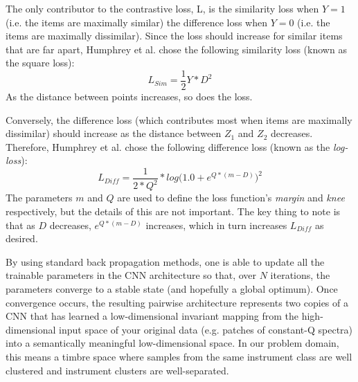 \documentclass[12pt]{report} 	%
\numberwithin{figure}{chapter}
\numberwithin{table}{chapter}
\numberwithin{equation}{chapter}
\begin{document}
\begin{flushleft}
The only contributor to the contrastive loss, L, is the similarity loss when $Y=1$ (i.e. the items are maximally similar) the difference loss when $Y=0$ (i.e. the items are maximally dissimilar). Since the loss should increase for similar items that are far apart, Humphrey et al. chose the following similarity loss (known as the square loss):
\begin{equation}
L_{Sim}=\frac{1}{2}Y*D^2
\end{equation}
As the distance between points increases, so does the loss. 

Conversely, the difference loss (which contributes most when items are maximally dissimilar) should increase as the distance between $Z_1$ and $Z_2$ decreases. Therefore, Humphrey et al. chose the following difference loss (known as the \textit{log-loss}):
\begin{equation}
L_{Diff}=\frac{1}{2*Q^2}*log\Big(1.0+e^{Q*(m-D)}\Big)^2
\end{equation}
The parameters $m$ and $Q$ are used to define the loss function's \textit{margin} and \textit{knee} respectively, but the details of this are not important. The key thing to note is that as $D$ decreases, $e^{Q*(m-D)}$ increases, which in turn increases $L_{Diff}$ as desired.

By using standard back propagation methods, one is able to update all the trainable parameters in the CNN architecture so that, over $N$ iterations, the parameters converge to a stable state (and hopefully a global optimum). Once convergence occurs, the resulting pairwise architecture represents two copies of a CNN that has learned a low-dimensional invariant mapping from the high-dimensional input space of your original data (e.g. patches of constant-Q spectra) into a semantically meaningful low-dimensional space. In our problem domain, this means a timbre space where samples from the same instrument class are well clustered and instrument clusters are well-separated.


\end{flushleft}
\end{document}
